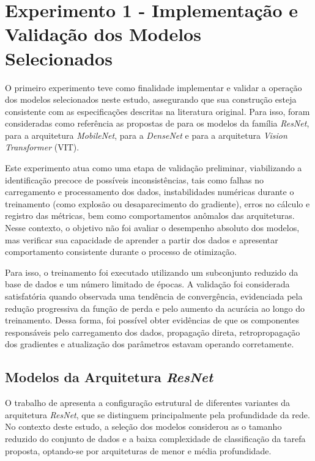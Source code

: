 \section{Experimento 1 - Implementação e Validação dos Modelos Selecionados}

O primeiro experimento teve como finalidade implementar e validar a operação dos modelos selecionados neste estudo, assegurando que sua construção esteja consistente com as especificações descritas na literatura original. Para isso, foram consideradas como referência as propostas de \cite{he2016} para os modelos da família \textit{ResNet}, \cite{Howard2017} para a arquitetura \textit{MobileNet}, \cite{Huang2017} para a \textit{DenseNet} e \cite{dosovitskiy2020vit} para a arquitetura \textit{Vision Transformer} (\acs{VIT}).

Este experimento atua como uma etapa de validação preliminar, viabilizando a identificação precoce de possíveis inconsistências, tais como falhas no carregamento e processamento dos dados, instabilidades numéricas durante o treinamento (como explosão ou desaparecimento do gradiente), erros no cálculo e registro das métricas, bem como comportamentos anômalos das arquiteturas. Nesse contexto, o objetivo não foi avaliar o desempenho absoluto dos modelos, mas verificar sua capacidade de aprender a partir dos dados e apresentar comportamento consistente durante o processo de otimização.

Para isso, o treinamento foi executado utilizando um subconjunto reduzido da base de dados e um número limitado de épocas. A validação foi considerada satisfatória quando observada uma tendência de convergência, evidenciada pela redução progressiva da função de perda e pelo aumento da acurácia ao longo do treinamento. Dessa forma, foi possível obter evidências de que os componentes responsáveis pelo carregamento dos dados, propagação direta, retropropagação dos gradientes e atualização dos parâmetros estavam operando corretamente.

\subsection{Modelos da Arquitetura \textit{ResNet}}

O trabalho de \cite{he2016} apresenta a configuração estrutural de diferentes variantes da arquitetura \textit{ResNet}, que se distinguem principalmente pela profundidade da rede. No contexto deste estudo, a seleção dos modelos considerou as o tamanho reduzido do conjunto de dados e a baixa complexidade de classificação da tarefa proposta, optando-se por arquiteturas de menor e média profundidade.

